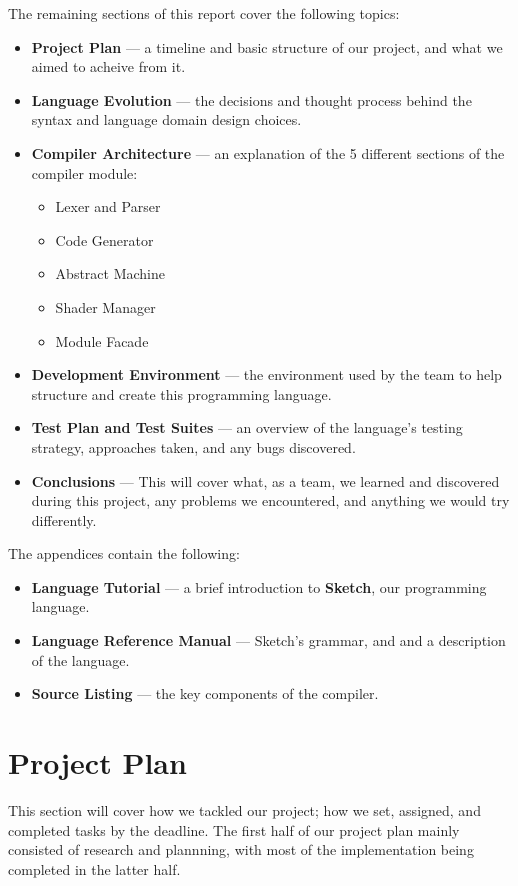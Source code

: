 \documentclass{l3proj}
\begin{document}
The remaining sections of this report cover the following topics:
\begin{itemize}
	\item \textbf{Project Plan} --- a timeline and basic structure of our project, and what we aimed to acheive from it.
	\item \textbf{Language Evolution} --- the decisions and thought process behind the syntax and language domain design choices.
	\item \textbf{Compiler Architecture} --- an explanation of the 5 different sections of the compiler module:
	\begin{itemize}
		\item Lexer and Parser
		\item Code Generator
		\item Abstract Machine
		\item Shader Manager
		\item Module Facade
	\end{itemize}
	\item \textbf{Development Environment} --- the environment used by the team to help structure and create this programming language.
	\item \textbf{Test Plan and Test Suites} --- an overview of the language's testing strategy, approaches taken, and any bugs discovered.
	\item \textbf{Conclusions} --- This will cover what, as a team, we learned and discovered during this project, any problems we encountered, and anything we would try differently.
\end{itemize}
The appendices contain the following:
\begin{itemize}
	\item \textbf{Language Tutorial} --- a brief introduction to  \textbf{Sketch}, our programming language.
	\item \textbf{Language Reference Manual} --- Sketch's grammar, and and a description of the language.
	\item \textbf{Source Listing} --- the key components of the compiler.
\end{itemize}

\chapter{Project Plan}
\label{plan}
This section will cover how we tackled our project; how we set, assigned, and completed tasks by the deadline. The first half of our project plan mainly consisted of research and plannning, with most of the implementation being completed in the latter half.
\end{document}
